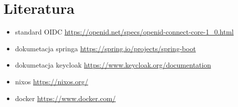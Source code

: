 \documentclass[../../spr.tex]{subfiles}
\begin{document}
\section{Literatura}


\begin{itemize}
  \item standard OIDC \url{https://openid.net/specs/openid-connect-core-1_0.html}
  \item dokumetacja springa \url{https://spring.io/projects/spring-boot}
  \item dokumetacja keycloak \url{https://www.keycloak.org/documentation}
  \item nixos \url{https://nixos.org/}
  \item docker \url{https://www.docker.com/}
\end{itemize}
\end{document}
